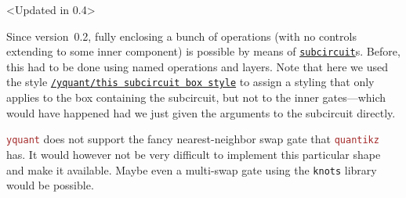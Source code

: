 \documentclass{scrartcl}
\makeatletter
\newenvironment{codeexample*}{%
   \VerbatimEnvironment%
   \let\FVB@VerbatimOut\minted@FVB@VerbatimOut
   \let\FVE@VerbatimOut\minted@FVE@VerbatimOut
   \minted@configlang{tex}%
   \minted@fvset
   \begin{VerbatimOut}[codes={\catcode`\^^I=12},firstline,lastline]{\minted@jobname.pyg}%
}{
   \end{VerbatimOut}%
   \minted@langlinenoson%
   \begin{adjustbox}{center}
       \minted@jobname.pyg %
   \end{adjustbox}\nopagebreak
   \minted@pygmentize{\minted@lang}%
   \minted@langlinenosoff%
   \par%
}
\def\pkg#1{\textcolor{brown}{\texttt{#1}}}
\def\gate#1{\hyperref[gate:#1]{\texttt{#1}}}
\def\style#1{\hyperref[style:#1]{\texttt{#1}}}
\def\Yquant{\pkg{yquant}}
\makeatother
\begin{document}
               \begin{example}<Updated in 0.4>
                  \begin{codeexample*}
                  \end{codeexample*}
                  Since version~0.2, fully enclosing a bunch of operations (with no controls extending to some inner component) is possible by means of \gate{subcircuit}s.
                  Before, this had to be done using named operations and layers.
                  Note that here we used the style \style{/yquant/this subcircuit box style} to assign a styling that only applies to the box containing the subcircuit, but not to the inner gates---which would have happened had we just given the arguments to the subcircuit directly.
               \end{example}

               \Yquant{} does not support the fancy nearest\hyp neighbor swap gate that \pkg{quantikz} has.
               It would however not be very difficult to implement this particular shape and make it available.
               Maybe even a multi\hyp swap gate using the \texttt{knots} library would be possible.

         \clearpage
\end{document}
